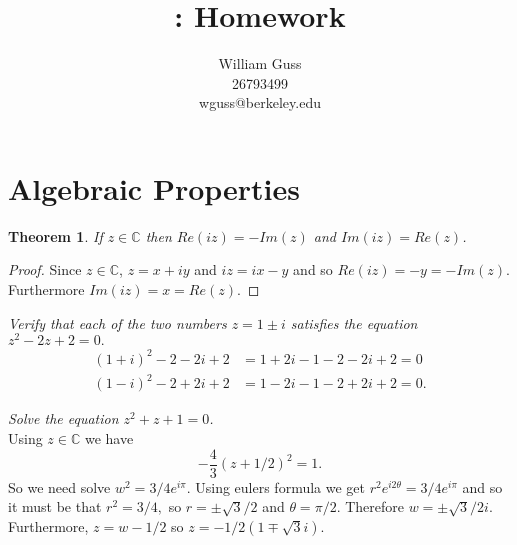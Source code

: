 \documentclass[letter]{article}
\title{\bCLASS: Homework \bHWN}
\author{William Guss\\26793499\\wguss@berkeley.edu}
\newtheorem{theorem}{Theorem}
\newenvironment{menumerate}{%
  \edef\backupindent{\the\parindent}%
  \enumerate%
  \setlength{\parindent}{\backupindent}%
}{\endenumerate}
\begin{document}
\maketitle
\thispagestyle{empty}


\setcounter{section}{1}
\section{Algebraic Properties}
\begin{menumerate}
	\setcounter{enumi}{1}
	\item \begin{theorem}
		If $z \in \mathbb{C}$ then $Re(iz) = -Im(z)$ and $Im(iz) = Re(z)$.
	\end{theorem}
	\begin{proof}
		Since $z \in \mathbb{C}$, $z = x+ iy$ and $iz = ix - y$ and so $Re(iz) = -y = -Im(z)$. Furthermore $Im(iz) = x = Re(z)$.
	\end{proof}
	\setcounter{enumi}{3}
	\item \emph{Verify that each of the two numbers $z = 1 \pm i$ satisfies the equation $z^2 − 2z + 2 = 0.$} \\
	\begin{equation}
		\begin{aligned}
			(1 + i)^2 - 2 - 2i + 2 &= 1 + 2i -1  -2 -2i + 2 = 0\\
			(1-i)^2 - 2 + 2i + 2 &= 1 -2i -1 -2 + 2i + 2 = 0.
		\end{aligned}
	\end{equation}
	\setcounter{enumi}{10}
	\item \emph{Solve the equation $z^2 +z +1 = 0$.} \\
	Using $z \in \mathbb{C}$ we have
	\begin{equation}
		-\frac{4}{3}(z + 1/2)^2 = 1.
	\end{equation}
	So we need solve $w^2 = 3/4e^{i\pi}$. Using eulers formula we get $r^2e^{i2\theta}=3/4e^{i\pi}$ and so it must be that $r^2 = 3/4,$ so $r = \pm \sqrt{3}/2$ and $\theta = \pi/2$. Therefore $w = \pm \sqrt{3}/2i.$ Furthermore, $z = w - 1/2$ so $z =  -1/2(1 \mp \sqrt{3}i)$.
\end{menumerate}
\end{document}
